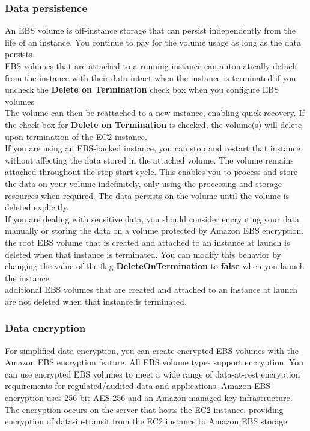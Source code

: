 \documentclass[12pt, letterpaper, twoside]{article}
\begin{document}
\subsubsection{Data persistence}
An EBS volume is off-instance storage that can persist independently from the life of an instance. You continue to pay for the volume usage 
as long as the data persists.\\

EBS volumes that are attached to a running instance can automatically detach from the instance with their data intact when the instance is 
terminated if you uncheck the \textbf{Delete on Termination} check box when you configure EBS volumes\\
The volume can then be reattached to a new instance, enabling quick recovery. If the check box for \textbf{Delete on Termination} is checked, 
the volume(s) will delete upon termination of the EC2 instance.\\
If you are using an EBS-backed instance, you can stop and restart that instance without affecting the data stored in the attached volume. The 
volume remains attached throughout the stop-start cycle. This enables you to process and store the data on your volume indefinitely, only 
using the processing and storage resources when required. The data persists on the volume until the volume is deleted explicitly.\\
If you are dealing with sensitive data, you should consider encrypting your data manually or storing the data on a volume protected by 
Amazon EBS encryption.\\

the root EBS volume that is created and attached to an instance at launch is deleted when that instance is terminated. You can modify this 
behavior by changing the value of the flag \textbf{DeleteOnTermination} to \textbf{false} when you launch the instance.\\
additional EBS volumes that are created and attached to an instance at launch are not deleted when that instance is terminated.\\

\subsubsection{Data encryption}
For simplified data encryption, you can create encrypted EBS volumes with the Amazon EBS encryption feature. All EBS volume types support 
encryption. You can use encrypted EBS volumes to meet a wide range of data-at-rest encryption requirements for regulated/audited data and 
applications. Amazon EBS encryption uses 256-bit AES-256 and an Amazon-managed key infrastructure. The encryption occurs on the server that 
hosts the EC2 instance, providing encryption of data-in-transit from the EC2 instance to Amazon EBS storage.\\
\end{document}
